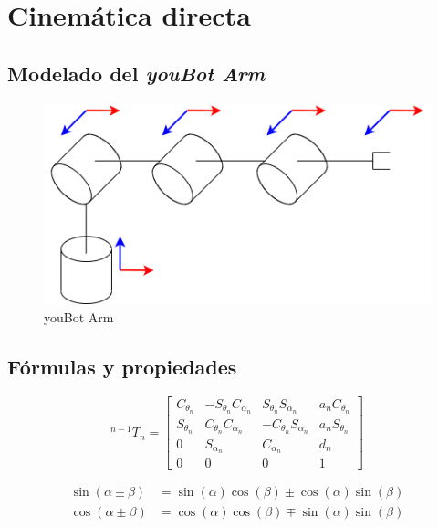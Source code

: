 \sffamily\large\justify


\section{Cinemática directa}

\subsection{Modelado del \emph{youBot Arm}}

\begin{figure}[h!]
    \centering
    \includegraphics[width=\linewidth]{youBot.png}
    \caption{\sffamily youBot Arm}
    \label{fig:youBotArmModel}
\end{figure}

\subsection{Fórmulas y propiedades}

\begin{equation*}
    ^{n-1}T_n =
    \begin{bmatrix}
        C_{\theta_n} & -S_{\theta_n}C_{\alpha_n} & S_{\theta_n}S_{\alpha_n} & a_nC_{\theta_n} \\
        S_{\theta_n} & C_{\theta_n}C_{\alpha_n} & -C_{\theta_n}S_{\alpha_n} & a_nS_{\theta_n} \\
        0 & S_{\alpha_n} & C_{\alpha_n} & d_n \\
        0 & 0 & 0 & 1
    \end{bmatrix}
\end{equation*}

\begin{equation*}
    \begin{split}
        \sin(\alpha \pm \beta) & = \sin(\alpha)\cos(\beta) \pm \cos(\alpha)\sin(\beta) \\
        \cos(\alpha \pm \beta) & = \cos(\alpha)\cos(\beta) \mp \sin(\alpha)\sin(\beta)
    \end{split}
\end{equation*}

